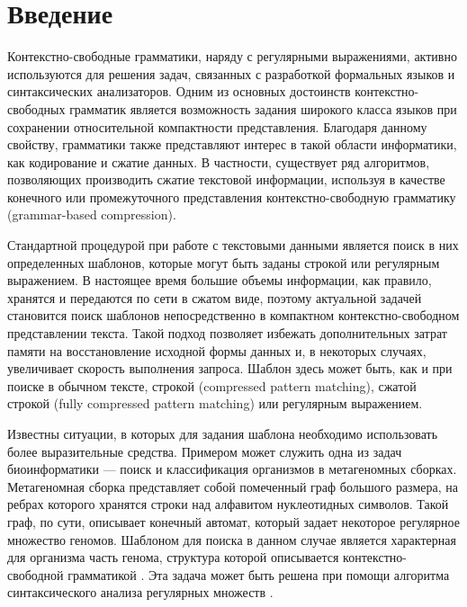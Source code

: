 \section*{Введение}

Контекстно-свободные грамматики, наряду с регулярными выражениями, активно используются для решения задач, связанных с разработкой формальных языков и синтаксических анализаторов. 
Одним из основных достоинств контекстно-свободных грамматик является возможность задания широкого класса языков при сохранении относительной компактности представления. 
Благодаря данному свойству, грамматики также представляют интерес в такой области информатики, как кодирование и сжатие данных. 
В частности, существует ряд алгоритмов, позволяющих производить сжатие текстовой информации, используя в качестве конечного \cite{Sequitur} или промежуточного \cite{Arimura} представления контекстно-свободную грамматику (grammar-based compression). 

Стандартной процедурой при работе с текстовыми данными является поиск в них определенных шаблонов, которые могут быть заданы строкой или регулярным выражением. 
В настоящее время большие объемы информации, как правило, хранятся и передаются по сети в сжатом виде, поэтому актуальной задачей становится поиск шаблонов непосредственно в компактном контекстно-свободном представлении текста.
Такой подход позволяет избежать дополнительных затрат памяти на восстановление исходной формы данных и, в некоторых случаях, увеличивает скорость выполнения запроса.
Шаблон здесь может быть, как и при поиске в обычном тексте, строкой (compressed pattern matching), сжатой строкой (fully compressed pattern matching) или регулярным выражением.

Известны ситуации, в которых для задания шаблона необходимо использовать более выразительные средства. 
Примером может служить одна из задач биоинформатики --- поиск и классификация организмов в метагеномных сборках. 
Метагеномная сборка представляет собой помеченный граф большого размера, на ребрах которого хранятся строки над алфавитом нуклеотидных символов. 
Такой граф, по сути, описывает конечный автомат, который задает некоторое регулярное множество геномов. 
Шаблоном для поиска в данном случае является характерная для организма часть генома, структура которой описывается контекстно-свободной грамматикой \cite{Anderson2013}. Эта задача может быть решена при помощи алгоритма синтаксического анализа регулярных множеств \cite{Nastya}.

